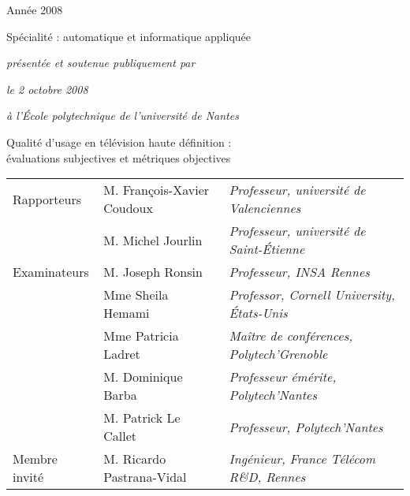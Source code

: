 \begin{titlepage}
\thispagestyle{empty}

\begin{center}

\vspace{.5cm}

\large{Année 2008}

\vspace{.5cm}


Spécialité : automatique et informatique appliquée

\vspace{.5cm}

\emph{présentée et soutenue publiquement par}

\vspace{.5cm}


\vspace{.5cm}

\emph{le 2 octobre 2008}

\emph{à l'École polytechnique de l'université de Nantes}

\vspace{1cm}

\huge{Qualité d'usage en télévision haute définition : \\évaluations subjectives et métriques objectives}

\vspace{1cm}

\end{center}

\begin{tabular}{lll} %
Rapporteurs
	& M. François-Xavier Coudoux 			& \emph{Professeur, université de Valenciennes}\\
	& M. Michel Jourlin						& \emph{Professeur, université de Saint-Étienne}\\
Examinateurs
	& M. Joseph Ronsin						& \emph{Professeur, INSA Rennes}\\
	& Mme	Sheila Hemami					& \emph{Professor, Cornell University, États-Unis}\\
	& Mme Patricia Ladret					& \emph{Maître de conférences, Polytech'Grenoble}\\
	& M. Dominique Barba 					& \emph{Professeur émérite, Polytech'Nantes}\\
	& M. Patrick Le Callet 					& \emph{Professeur, Polytech'Nantes}\\
Membre invité
	& M. Ricardo Pastrana-Vidal 			& \emph{Ingénieur, France Télécom R\&D, Rennes}\\
\end{tabular}


\end{titlepage}
